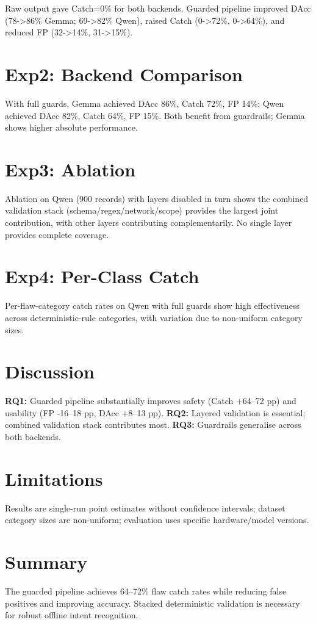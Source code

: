 Raw output gave Catch=0\% for both backends. Guarded pipeline improved DAcc (78->86\% Gemma; 69->82\% Qwen), raised Catch (0->72\%, 0->64\%), and reduced FP (32->14\%, 31->15\%).

\section{Exp2: Backend Comparison}\label{sec:results-exp2}

With full guards, Gemma achieved DAcc 86\%, Catch 72\%, FP 14\%; Qwen achieved DAcc 82\%, Catch 64\%, FP 15\%. Both benefit from guardrails; Gemma shows higher absolute performance.

\section{Exp3: Ablation}\label{sec:results-exp3}

Ablation on Qwen (900 records) with layers disabled in turn shows the combined validation stack (schema/regex/network/scope) provides the largest joint contribution, with other layers contributing complementarily. No single layer provides complete coverage.

\section{Exp4: Per-Class Catch}\label{sec:results-exp4}

Per-flaw-category catch rates on Qwen with full guards show high effectiveness across deterministic-rule categories, with variation due to non-uniform category sizes.

\section{Discussion}\label{sec:results-discussion}

\textbf{RQ1:} Guarded pipeline substantially improves safety (Catch +64--72 pp) and usability (FP -16--18 pp, DAcc +8--13 pp). \textbf{RQ2:} Layered validation is essential; combined validation stack contributes most. \textbf{RQ3:} Guardrails generalise across both backends.

\section{Limitations}\label{sec:results-limitations}

Results are single-run point estimates without confidence intervals; dataset category sizes are non-uniform; evaluation uses specific hardware/model versions.

\section{Summary}\label{sec:results-summary}

The guarded pipeline achieves 64--72\% flaw catch rates while reducing false positives and improving accuracy. Stacked deterministic validation is necessary for robust offline intent recognition.
